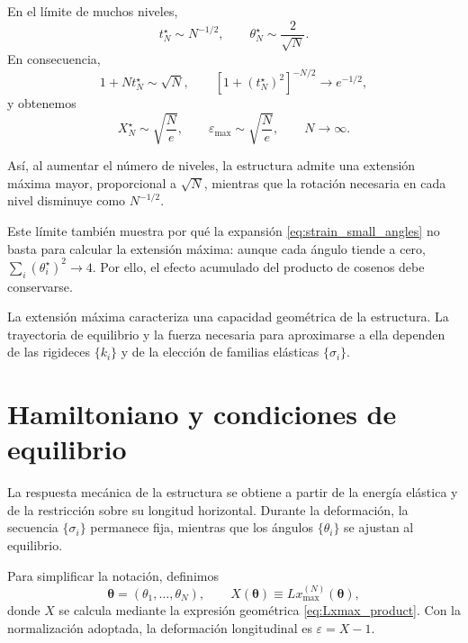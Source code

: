 \documentclass[11pt,a4paper]{article}
\begin{document}
En el límite de muchos niveles,
\begin{equation}
t_N^\star\sim N^{-1/2},
\qquad
\theta_N^\star\sim\frac{2}{\sqrt{N}}.
\end{equation}
En consecuencia,
\begin{equation}
1+Nt_N^\star\sim\sqrt{N},
\qquad
\left[1+(t_N^\star)^2\right]^{-N/2}
\longrightarrow e^{-1/2},
\end{equation}
y obtenemos
\begin{equation}
\boxed{
X_N^\star\sim\sqrt{\frac{N}{e}},
\qquad
\varepsilon_{\max}\sim\sqrt{\frac{N}{e}},
\qquad N\to\infty.
}
\label{eq:max_extension_scaling}
\end{equation}

Así, al aumentar el número de niveles, la estructura admite
una extensión máxima mayor, proporcional a $\sqrt{N}$,
mientras que la rotación necesaria en cada nivel disminuye
como $N^{-1/2}$.

Este límite también muestra por qué la expansión
\eqref{eq:strain_small_angles} no basta para calcular la
extensión máxima: aunque cada ángulo tiende a cero,
$\sum_i(\theta_i^\star)^2\to 4$. Por ello, el efecto acumulado
del producto de cosenos debe conservarse.

La extensión máxima caracteriza una capacidad geométrica
de la estructura. La trayectoria de equilibrio y la fuerza
necesaria para aproximarse a ella dependen de las rigideces
$\{k_i\}$ y de la elección de familias elásticas
$\{\sigma_i\}$.

\section{Hamiltoniano y condiciones de equilibrio}
\label{sec:hamiltonian}

La respuesta mecánica de la estructura se obtiene a partir de
la energía elástica y de la restricción sobre su longitud horizontal.
Durante la deformación, la secuencia $\{\sigma_i\}$ permanece fija,
mientras que los ángulos $\{\theta_i\}$ se ajustan al equilibrio.

Para simplificar la notación, definimos
\begin{equation}
\boldsymbol{\theta}=(\theta_1,\ldots,\theta_N),
\qquad
X(\boldsymbol{\theta})
\equiv Lx_{\max}^{(N)}(\boldsymbol{\theta}),
\label{eq:X_def}
\end{equation}
donde $X$ se calcula mediante la expresión geométrica
\eqref{eq:Lxmax_product}. Con la normalización adoptada,
la deformación longitudinal es $\varepsilon=X-1$.
\end{document}
